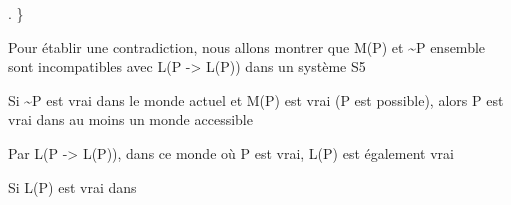 \documentclass[10pt]{report}
\begin{document}
\begin{coqdoccode}
\coqdocindent{2.00em}
 .\coqdoceol
\coqdocindent{1.00em}
\}\coqdoceol
\coqdocindent{1.00em}
\coqdoceol
\coqdocindent{1.00em}
\begin{coqdoccomment}
\coqdocindent{0.50em}
Pour\coqdocindent{0.50em}
établir\coqdocindent{0.50em}
une\coqdocindent{0.50em}
contradiction,\coqdocindent{0.50em}
nous\coqdocindent{0.50em}
allons\coqdocindent{0.50em}
montrer\coqdocindent{0.50em}
que\coqdocindent{0.50em}
M(P)\coqdocindent{0.50em}
et\coqdocindent{0.50em}
\~{}P\coqdocindent{0.50em}
ensemble\coqdoceol
\coqdocindent{2.50em}
sont\coqdocindent{0.50em}
incompatibles\coqdocindent{0.50em}
avec\coqdocindent{0.50em}
L(P\coqdocindent{0.50em}
->\coqdocindent{0.50em}
L(P))\coqdocindent{0.50em}
dans\coqdocindent{0.50em}
un\coqdocindent{0.50em}
système\coqdocindent{0.50em}
S5\coqdocindent{0.50em}
\end{coqdoccomment}
\coqdoceol
\coqdocnoindent
\coqdoceol
\coqdocindent{1.00em}
\begin{coqdoccomment}
\coqdocindent{0.50em}
Si\coqdocindent{0.50em}
\~{}P\coqdocindent{0.50em}
est\coqdocindent{0.50em}
vrai\coqdocindent{0.50em}
dans\coqdocindent{0.50em}
le\coqdocindent{0.50em}
monde\coqdocindent{0.50em}
actuel\coqdocindent{0.50em}
et\coqdocindent{0.50em}
M(P)\coqdocindent{0.50em}
est\coqdocindent{0.50em}
vrai\coqdocindent{0.50em}
(P\coqdocindent{0.50em}
est\coqdocindent{0.50em}
possible),\coqdoceol
\coqdocindent{2.50em}
alors\coqdocindent{0.50em}
P\coqdocindent{0.50em}
est\coqdocindent{0.50em}
vrai\coqdocindent{0.50em}
dans\coqdocindent{0.50em}
au\coqdocindent{0.50em}
moins\coqdocindent{0.50em}
un\coqdocindent{0.50em}
monde\coqdocindent{0.50em}
accessible\coqdocindent{0.50em}
\end{coqdoccomment}
\coqdoceol
\coqdocindent{1.00em}
\coqdoceol
\coqdocindent{1.00em}
\begin{coqdoccomment}
\coqdocindent{0.50em}
Par\coqdocindent{0.50em}
L(P\coqdocindent{0.50em}
->\coqdocindent{0.50em}
L(P)),\coqdocindent{0.50em}
dans\coqdocindent{0.50em}
ce\coqdocindent{0.50em}
monde\coqdocindent{0.50em}
où\coqdocindent{0.50em}
P\coqdocindent{0.50em}
est\coqdocindent{0.50em}
vrai,\coqdocindent{0.50em}
L(P)\coqdocindent{0.50em}
est\coqdocindent{0.50em}
également\coqdocindent{0.50em}
vrai\coqdocindent{0.50em}
\end{coqdoccomment}
\coqdoceol
\coqdocindent{1.00em}
\begin{coqdoccomment}
\coqdocindent{0.50em}
Si\coqdocindent{0.50em}
L(P)\coqdocindent{0.50em}
est\coqdocindent{0.50em}
vrai\coqdocindent{0.50em}
dans\coqdocindent{0.50em}

\end{coqdoccomment}
\end{coqdoccode}
\end{document}

